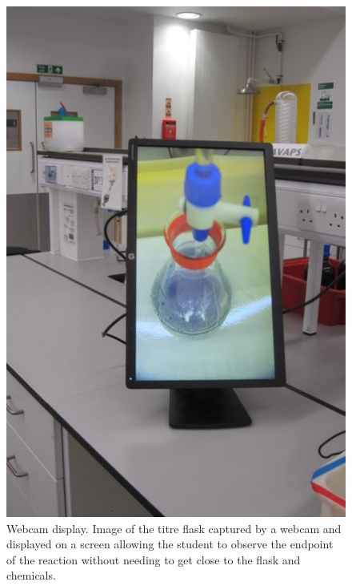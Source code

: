 \documentclass[11.5pt]{sig-alternate} %
\begin{document}
\begin{large}
\begin{figure}[htbp]
    \centering
    \includegraphics[width=\columnwidth]{images/fig10a.jpeg}
    \caption{Webcam display. Image of the titre flask captured by a webcam and displayed on a screen allowing the student to observe the endpoint of the reaction without needing to get close to the flask and chemicals.}
    \label{Figure 10}
\end{figure}


\end{large}
\end{document}
